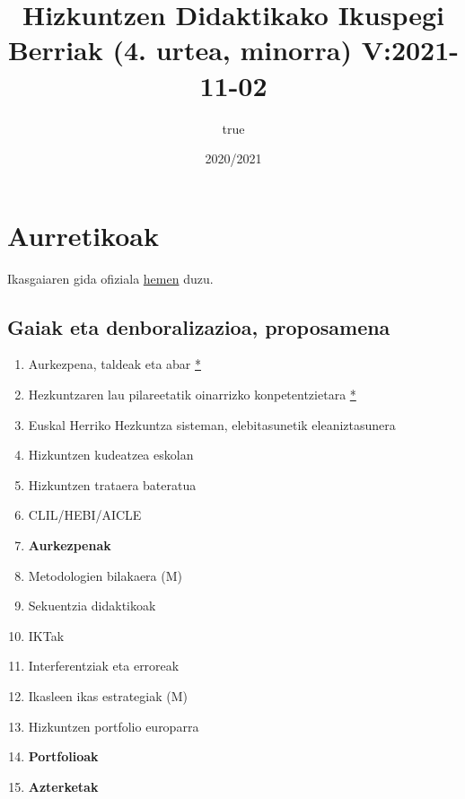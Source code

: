 \documentclass[
]{book}
\title{Hizkuntzen Didaktikako Ikuspegi Berriak (4. urtea, minorra) V:2021-11-02}
\author{true}
\date{2020/2021}
\providecommand{\tightlist}{%
  \setlength{\itemsep}{0pt}\setlength{\parskip}{0pt}}
\begin{document}
\maketitle

{
\setcounter{tocdepth}{1}
\tableofcontents
}
\hypertarget{aurretikoak}{%
\chapter*{Aurretikoak}\label{aurretikoak}}

Ikasgaiaren gida ofiziala \href{https://www.ehu.eus/eu/lehen-hezkuntzako-gradua-bizkaia/kreditu-eta-irakasgaiak?p_redirect=consultaAsignatura\&p_cod_proceso=egr\&p_anyo_acad=20190\&p_ciclo=X\&p_curso=4\&p_cod_asignatura=27574}{hemen} duzu.

\hypertarget{gaiak-eta-denboralizazioa-proposamena}{%
\section*{Gaiak eta denboralizazioa, proposamena}\label{gaiak-eta-denboralizazioa-proposamena}}

\begin{enumerate}
\def\labelenumi{\arabic{enumi})}
\tightlist
\item
  Aurkezpena, taldeak eta abar \href{../diapoak/0-Aurkezpena-21.pdf}{*}
\item
  Hezkuntzaren lau pilareetatik oinarrizko konpetentzietara \href{../diapoak/01-diapo.html}{*}
\item
  Euskal Herriko Hezkuntza sisteman, elebitasunetik eleaniztasunera
\item
  Hizkuntzen kudeatzea eskolan
\item
  Hizkuntzen trataera bateratua
\item
  CLIL/HEBI/AICLE
\item
  \textbf{Aurkezpenak}
\item
  Metodologien bilakaera (M)
\item
  Sekuentzia didaktikoak
\item
  IKTak
\item
  Interferentziak eta erroreak
\item
  Ikasleen ikas estrategiak (M)
\item
  Hizkuntzen portfolio europarra
\item
  \textbf{Portfolioak}
\item
  \textbf{Azterketak}
\end{enumerate}
\end{document}
